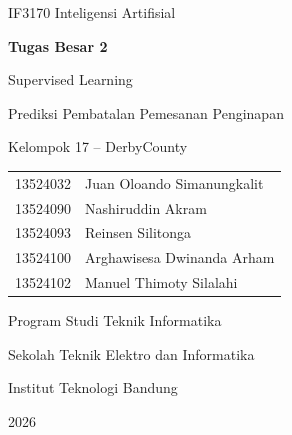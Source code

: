 \documentclass[11pt,a4paper,oneside]{report}
\renewcommand{\_}{\garisbawahasli\allowbreak}
\begin{document}
\ifdefined\NaiveBayesOnly

\else

\begin{titlepage}
  \centering
  {\large IF3170 Inteligensi Artifisial\par}
  \vspace{2.5cm}
  {\Huge\bfseries Tugas Besar 2\par}
  \vspace{0.5cm}
  {\LARGE Supervised Learning\par}
  \vspace{0.3cm}
  {\Large Prediksi Pembatalan Pemesanan Penginapan\par}
  \vspace{2.5cm}
  {\Large Kelompok 17 -- DerbyCounty\par}
  \vspace{1cm}
  \begin{tabular}{ll}
    13524032 & Juan Oloando Simanungkalit \\
    13524090 & Nashiruddin Akram \\
    13524093 & Reinsen Silitonga \\
    13524100 & Arghawisesa Dwinanda Arham \\
    13524102 & Manuel Thimoty Silalahi \\
  \end{tabular}
  \vfill
  {\large Program Studi Teknik Informatika\par}
  {\large Sekolah Teknik Elektro dan Informatika\par}
  {\large Institut Teknologi Bandung\par}
  {\large 2026\par}
\end{titlepage}

\tableofcontents
\listoffigures
\listoftables
\lstlistoflistings
\clearpage
{}








\appendix


\fi
\end{document}
